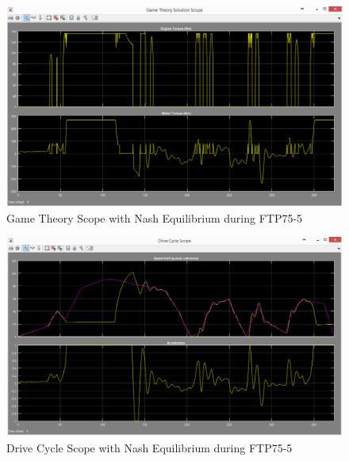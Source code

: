\begin{figure}[h]
\centering
\includegraphics[scale=0.4]{figures/NashEquilibrium/FTP75-5/gameTheory16Juni}
\caption{Game Theory Scope with Nash Equilibrium during FTP75-5}
\label{fig:gtne5}
\end{figure}

\begin{figure}[h]
\centering
\includegraphics[scale=0.4]{figures/NashEquilibrium/FTP75-5/driveCycle16Juni}
\caption{Drive Cycle Scope with Nash Equilibrium during FTP75-5}
\label{fig:dcne5}
\end{figure}

